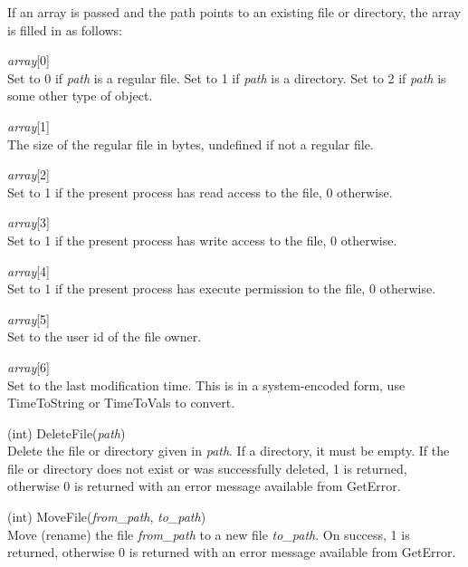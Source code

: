 \begin{description}
If an array is passed and the path points to an existing file or
directory, the array is filled in as follows:

\begin{description}
\item{\it array\/}[0]\\
Set to 0 if {\it path} is a regular file.  Set to 1 if {\it path} is a
directory.  Set to 2 if {\it path} is some other type of object.

\item{\it array\/}[1]\\
The size of the regular file in bytes, undefined if not a regular
file.

\item{\it array\/}[2]\\
Set to 1 if the present process has read access to the file, 0
otherwise.

\item{\it array\/}[3]\\
Set to 1 if the present process has write access to the file, 0
otherwise.

\item{\it array\/}[4]\\
Set to 1 if the present process has execute permission to the
file, 0 otherwise.

\item{\it array\/}[5]\\
Set to the user id of the file owner.

\item{\it array\/}[6]\\
Set to the last modification time.  This is in a system-encoded form,
use {\vt TimeToString} or {\vt TimeToVals} to convert.
\end{description}

\item{(int) \vt DeleteFile({\it path})}\\
Delete the file or directory given in {\it path}.  If a directory, it
must be empty.  If the file or directory does not exist or was
successfully deleted, 1 is returned, otherwise 0 is returned with an
error message available from {\vt GetError}.

\item{(int) \vt MoveFile({\it from\_path}, {\it to\_path\/})}\\
Move (rename) the file {\it from\_path} to a new file {\it
to\_path\/}.  On success, 1 is returned, otherwise 0 is returned with
an error message available from {\vt GetError}. 


\end{description}
